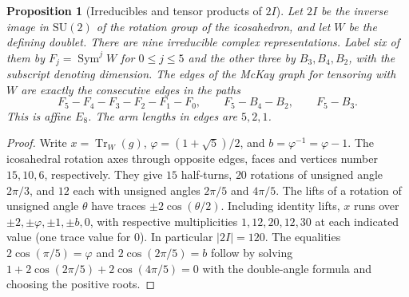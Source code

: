 \documentclass[aps,pra,onecolumn,superscriptaddress,nofootinbib,10pt]{revtex4-2}
\newtheorem{proposition}[theorem]{Proposition}
\theoremstyle{definition}
\theoremstyle{remark}
\newcommand{\SU}{\mathrm{SU}}
\begin{document}
\begin{proposition}[Irreducibles and tensor products of $2I$]\label{gn:mckay}
Let $2I$ be the inverse image in $\SU(2)$ of the rotation
group of the icosahedron, and let $W$ be the defining doublet. There are
nine irreducible complex representations. Label six of them by
$F_j=\operatorname{Sym}^jW$ for $0\le j\le5$ and the other three by
$B_3,B_4,B_2$, with the subscript denoting dimension.
The edges of the McKay graph for tensoring with $W$ are exactly the
consecutive edges in the paths
\begin{equation}\label{gn:arms}
 F_5-F_4-F_3-F_2-F_1-F_0,\qquad F_5-B_4-B_2,\qquad F_5-B_3 .
\end{equation}
This is affine $E_8$. The arm lengths in edges are $5,2,1$.
\end{proposition}
\begin{proof}
Write $x=\operatorname{Tr}_W(g)$, $\varphi=(1+\sqrt5)/2$, and
$b=\varphi^{-1}=\varphi-1$. The icosahedral rotation axes through
opposite edges, faces and vertices number $15,10,6$, respectively.
They give $15$ half-turns, $20$ rotations of unsigned angle $2\pi/3$,
and $12$ each with unsigned angles $2\pi/5$ and $4\pi/5$.
The lifts of a rotation of unsigned angle $\theta$ have traces
$\pm2\cos(\theta/2)$. Including identity lifts, $x$ runs over
$\pm2,\pm\varphi,\pm1,\pm b,0$, with respective multiplicities
$1,12,20,12,30$ at each indicated value (one trace value for $0$).
In particular $|2I|=120$. The equalities
$2\cos(\pi/5)=\varphi$ and $2\cos(2\pi/5)=b$ follow by solving
$1+2\cos(2\pi/5)+2\cos(4\pi/5)=0$ with the double-angle formula
and choosing the positive roots.


\end{proof}
\end{document}
